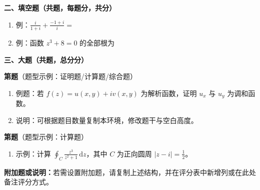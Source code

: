 \documentclass[a4paper]{article}
\begin{document}
\begin{flushleft}
\begin{enumerate}[label=\arabic*.]
\end{enumerate}

\vspace{2em}

\textbf{二、填空题（共\underline{\hspace{1cm}}题，每题\underline{\hspace{1cm}}分，共\underline{\hspace{1cm}}分）}
\begin{enumerate}[label=\arabic*.]
    \item 例：\( \frac{i}{1+i} + \frac{-1+i}{i} = \)\underline{\hspace{3cm}}
    \item 例：函数 \( z^3 + 8 = 0 \) 的全部根为 \underline{\hspace{5cm}}
\end{enumerate}

\vspace{3em}

\textbf{三、大题（共\underline{\hspace{1cm}}题，总分\underline{\hspace{1cm}}分）}

\textbf{第\underline{\hspace{1cm}}题}\quad（题型示例：证明题/计算题/综合题）
\begin{enumerate}[label=(\arabic*)]
    \item 例题：若 \( f(z) = u(x,y) + iv(x,y) \) 为解析函数，证明 \( u_x \) 与 \( u_y \) 为调和函数。
    \item 说明：可根据题目数量复制本环境，修改题干与空白高度。
\end{enumerate}
\vspace{15em}

\textbf{第\underline{\hspace{1cm}}题}\quad（题型示例：计算题）
\begin{enumerate}[label=(\arabic*)]
    \item 示例：计算 \( \oint_C \frac{z^3}{z^2+1}\,\mathrm{d}z \)，其中 \( C \) 为正向圆周 \( |z-i| = \frac{1}{2} \)。
\end{enumerate}
\vspace{18em}


\textbf{附加题或说明：}若需设置附加题，请复制上述结构，并在评分表中新增列或在此处备注评分方式。

\end{flushleft}
\end{document}
